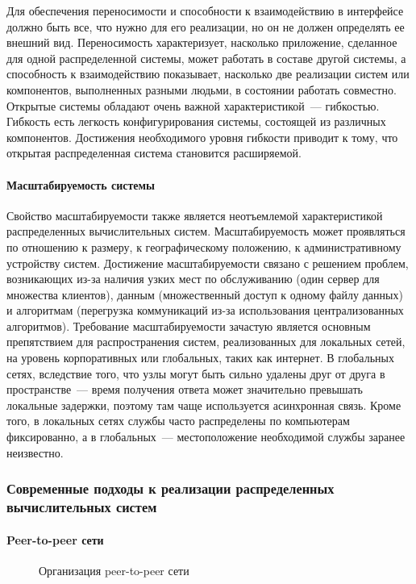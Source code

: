 Для обеспечения переносимости и способности к взаимодействию в интерфейсе должно быть все, что нужно для его реализации, но он не должен определять ее внешний вид. Переносимость характеризует, насколько приложение, сделанное для одной распределенной системы, может работать в составе другой системы, а способность к взаимодействию показывает, насколько две реализации систем или компонентов, выполненных разными людьми, в состоянии работать совместно. Открытые системы обладают очень важной характеристикой~--- гибкостью. Гибкость есть легкость конфигурирования системы, состоящей из различных компонентов. Достижения необходимого уровня гибкости приводит к тому, что открытая распределенная система становится расширяемой.

\paragraph{Масштабируемость системы}

Свойство масштабируемости также является неотъемлемой характеристикой распределенных вычислительных систем. Масштабируемость может проявляться по отношению к размеру, к географическому положению, к административному устройству систем. Достижение масштабируемости связано с решением проблем, возникающих из-за наличия узких мест по обслуживанию (один сервер для множества клиентов), данным (множественный доступ к одному файлу данных) и алгоритмам (перегрузка коммуникаций из-за использования централизованных алгоритмов). Требование масштабируемости зачастую является основным препятствием для распространения систем, реализованных для локальных сетей, на уровень корпоративных или глобальных, таких как интернет. В глобальных сетях, вследствие того, что узлы могут быть сильно удалены друг от друга в пространстве~--- время получения ответа может значительно превышать локальные задержки, поэтому там чаще используется асинхронная связь. Кроме того, в локальных сетях службы часто распределены по компьютерам фиксированно, а в глобальных~--- местоположение необходимой службы заранее неизвестно.

\subsubsection{Современные подходы к реализации распределенных вычислительных систем}
\paragraph{Peer-to-peer сети}
\begin{figure}[h]
\caption{Организация peer-to-peer сети}
\label{0:peer}
\end{figure}

